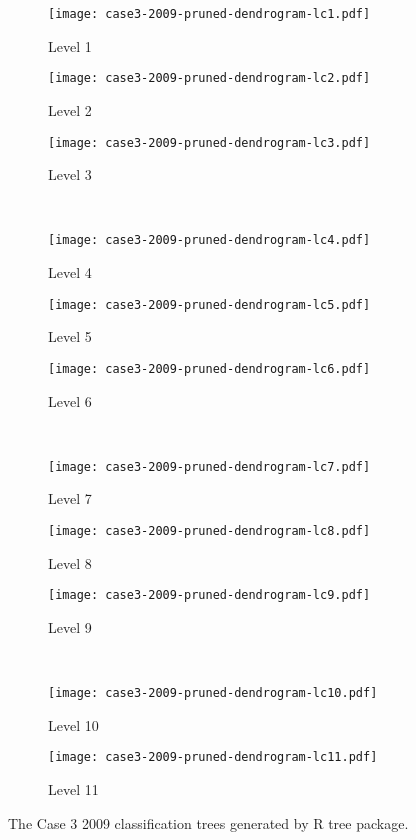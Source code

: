 \begin{appendices}

\begin{figure}[!ht] \centering
	\captionsetup[subfigure]{width=2.0in}
	\begin{subfigure}[t]{0.32\textwidth}
		\texttt{[image: case3-2009-pruned-dendrogram-lc1.pdf]}
		\caption{Level 1}
	\end{subfigure}
	\begin{subfigure}[t]{0.32\textwidth}
		\texttt{[image: case3-2009-pruned-dendrogram-lc2.pdf]}
		\caption{Level 2}
	\end{subfigure}
	\begin{subfigure}[t]{0.32\textwidth}
		\texttt{[image: case3-2009-pruned-dendrogram-lc3.pdf]}
		\caption{Level 3}
	\end{subfigure}\\
	\vspace{5pt}
	\begin{subfigure}[t]{0.32\textwidth}
		\texttt{[image: case3-2009-pruned-dendrogram-lc4.pdf]}
		\caption{Level 4}
	\end{subfigure}
	\begin{subfigure}[t]{0.32\textwidth}
		\texttt{[image: case3-2009-pruned-dendrogram-lc5.pdf]}
		\caption{Level 5}
	\end{subfigure}
	\begin{subfigure}[t]{0.32\textwidth}
		\texttt{[image: case3-2009-pruned-dendrogram-lc6.pdf]}
		\caption{Level 6}
	\end{subfigure}\\
	\vspace{5pt}	
	\begin{subfigure}[t]{0.32\textwidth}
		\texttt{[image: case3-2009-pruned-dendrogram-lc7.pdf]}
		\caption{Level 7}
	\end{subfigure}
	\begin{subfigure}[t]{0.32\textwidth}
		\texttt{[image: case3-2009-pruned-dendrogram-lc8.pdf]}
		\caption{Level 8}
	\end{subfigure}
	\begin{subfigure}[t]{0.32\textwidth}
		\texttt{[image: case3-2009-pruned-dendrogram-lc9.pdf]}
		\caption{Level 9}
	\end{subfigure}\\
	\vspace{5pt}
	\begin{subfigure}[t]{0.32\textwidth}
		\texttt{[image: case3-2009-pruned-dendrogram-lc10.pdf]}
		\caption{Level 10}
	\end{subfigure}
	\begin{subfigure}[t]{0.32\textwidth}
		\texttt{[image: case3-2009-pruned-dendrogram-lc11.pdf]}
		\caption{Level 11}
	\end{subfigure}
	\vspace{5pt}
	\caption[The Case 3 2009 classification trees generated by R tree package.]{The Case 3 2009 classification trees generated by R tree package.}
	\label{fig: appendix-fig.c21.tree}
\end{figure}


\end{appendices}
